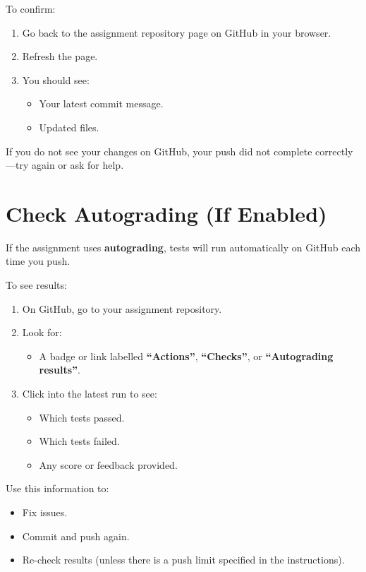 \documentclass[11pt]{scrartcl}
\begin{document}
To confirm:

\begin{enumerate}[label=\arabic*., nosep]
  \item Go back to the assignment repository page on GitHub in your browser.
  \item Refresh the page.
  \item You should see:
    \begin{itemize}[nosep]
      \item Your latest commit message.
      \item Updated files.
    \end{itemize}
\end{enumerate}

If you do not see your changes on GitHub, your push did not complete correctly---try again or ask for help.

\section{Check Autograding (If Enabled)}

If the assignment uses \textbf{autograding}, tests will run automatically on GitHub each time you push.

To see results:

\begin{enumerate}[label=\arabic*., nosep]
  \item On GitHub, go to your assignment repository.
  \item Look for:
    \begin{itemize}[nosep]
      \item A badge or link labelled \textbf{``Actions''}, \textbf{``Checks''}, or \textbf{``Autograding results''}.
    \end{itemize}
  \item Click into the latest run to see:
    \begin{itemize}[nosep]
      \item Which tests passed.
      \item Which tests failed.
      \item Any score or feedback provided.
    \end{itemize}
\end{enumerate}

Use this information to:

\begin{itemize}[nosep]
  \item Fix issues.
  \item Commit and push again.
  \item Re-check results (unless there is a push limit specified in the instructions).
\end{itemize}
\end{document}
